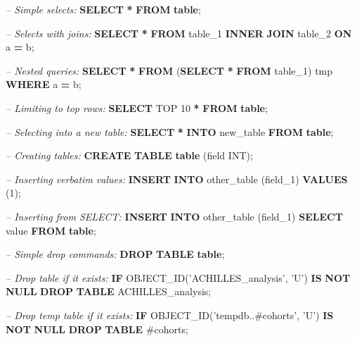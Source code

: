 \documentclass[11pt]{book}
\newenvironment{Shaded}{\begin{snugshade}}{\end{snugshade}}
\newcommand{\CommentTok}[1]{\textcolor[rgb]{0.56,0.35,0.01}{\textit{#1}}}
\newcommand{\ControlFlowTok}[1]{\textcolor[rgb]{0.13,0.29,0.53}{\textbf{#1}}}
\newcommand{\DataTypeTok}[1]{\textcolor[rgb]{0.13,0.29,0.53}{#1}}
\newcommand{\DecValTok}[1]{\textcolor[rgb]{0.00,0.00,0.81}{#1}}
\newcommand{\FunctionTok}[1]{\textcolor[rgb]{0.00,0.00,0.00}{#1}}
\newcommand{\KeywordTok}[1]{\textcolor[rgb]{0.13,0.29,0.53}{\textbf{#1}}}
\newcommand{\NormalTok}[1]{#1}
\newcommand{\OperatorTok}[1]{\textcolor[rgb]{0.81,0.36,0.00}{\textbf{#1}}}
\newcommand{\StringTok}[1]{\textcolor[rgb]{0.31,0.60,0.02}{#1}}
\theoremstyle{definition}
\theoremstyle{definition}
\theoremstyle{definition}
\theoremstyle{remark}
\begin{document}
\begin{Shaded}
\begin{Highlighting}[]
\CommentTok{-- Simple selects:}
\KeywordTok{SELECT} \OperatorTok{*} \KeywordTok{FROM} \KeywordTok{table}\NormalTok{;}

\CommentTok{-- Selects with joins:}
\KeywordTok{SELECT} \OperatorTok{*} \KeywordTok{FROM}\NormalTok{ table_1 }\KeywordTok{INNER} \KeywordTok{JOIN}\NormalTok{ table_2 }\KeywordTok{ON}\NormalTok{ a }\OperatorTok{=}\NormalTok{ b;}

\CommentTok{-- Nested queries:}
\KeywordTok{SELECT} \OperatorTok{*} \KeywordTok{FROM}\NormalTok{ (}\KeywordTok{SELECT} \OperatorTok{*} \KeywordTok{FROM}\NormalTok{ table_1) tmp }\KeywordTok{WHERE}\NormalTok{ a }\OperatorTok{=}\NormalTok{ b;}

\CommentTok{-- Limiting to top rows:}
\KeywordTok{SELECT}\NormalTok{ TOP }\DecValTok{10} \OperatorTok{*} \KeywordTok{FROM} \KeywordTok{table}\NormalTok{;}

\CommentTok{-- Selecting into a new table:}
\KeywordTok{SELECT} \OperatorTok{*} \KeywordTok{INTO}\NormalTok{ new_table }\KeywordTok{FROM} \KeywordTok{table}\NormalTok{;}

\CommentTok{-- Creating tables:}
\KeywordTok{CREATE} \KeywordTok{TABLE} \KeywordTok{table}\NormalTok{ (field }\DataTypeTok{INT}\NormalTok{);}

\CommentTok{-- Inserting verbatim values:}
\KeywordTok{INSERT} \KeywordTok{INTO}\NormalTok{ other_table (field_1) }\KeywordTok{VALUES}\NormalTok{ (}\DecValTok{1}\NormalTok{);}

\CommentTok{-- Inserting from SELECT:}
\KeywordTok{INSERT} \KeywordTok{INTO}\NormalTok{ other_table (field_1) }\KeywordTok{SELECT} \FunctionTok{value} \KeywordTok{FROM} \KeywordTok{table}\NormalTok{;}
  
\CommentTok{-- Simple drop commands:}
\KeywordTok{DROP} \KeywordTok{TABLE} \KeywordTok{table}\NormalTok{;}

\CommentTok{-- Drop table if it exists:}
\ControlFlowTok{IF}\NormalTok{ OBJECT_ID(}\StringTok{'ACHILLES_analysis'}\NormalTok{, }\StringTok{'U'}\NormalTok{) }\KeywordTok{IS} \KeywordTok{NOT} \KeywordTok{NULL}
  \KeywordTok{DROP} \KeywordTok{TABLE}\NormalTok{ ACHILLES_analysis;}
  
\CommentTok{-- Drop temp table if it exists:}
\ControlFlowTok{IF}\NormalTok{ OBJECT_ID(}\StringTok{'tempdb..#cohorts'}\NormalTok{, }\StringTok{'U'}\NormalTok{) }\KeywordTok{IS} \KeywordTok{NOT} \KeywordTok{NULL}
  \KeywordTok{DROP} \KeywordTok{TABLE}\NormalTok{ #cohorts;  }


\end{Highlighting}
\end{Shaded}
\end{document}
